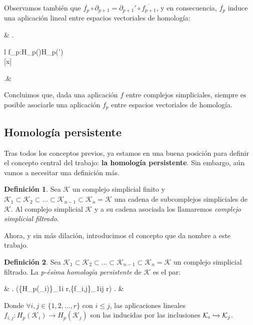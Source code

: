 \documentclass[12pt]{article}
\numberwithin{equation}{section}
\theoremstyle{definition}
\newtheorem{defi}{Definición}
\theoremstyle{remark}
\theoremstyle{plain}
\begin{document}
		Observamos también que $\overline{f_{p}}\circ\partial_{p+1}=\partial_{p+1}'\circ\overline{f_{p+1}}$, y en consecuencia, $\overline{f_{p}}$ induce una aplicación lineal
		entre espacios vectoriales de homología:	
		\begin{flalign*}
			& \left.
			\begin{array}{l}
				f_{p}:H_{p}()\rightarrow H_{p}(')\\[2pt] 
				\hspace{1.35cm} [x] \mapsto [\overline{f_{p}(x)}]
			\end{array}
			\right.&
		\end{flalign*}

		Concluimos que, dada una aplicación $f$ entre complejos simpliciales, siempre es posible asociarle una aplicación $f_{p}$ entre espacios vectoriales de homología.
	
	\subsection{Homología persistente}	
		
		Tras todos los conceptos previos, ya estamos en una buena posición para definir el concepto central del trabajo: \textbf{la homología persistente}. Sin embargo, aún
		vamos a necesitar una definición más.

		\begin{defi}
		
			Sea $\mathcal{K}$ un complejo simplicial finito y $\mathcal{K}_{1}\subset\mathcal{K}_{2}\subset...\subset\mathcal{K}_{n-1}\subset\mathcal{K}_{n}=\mathcal{K}$
			una cadena de subcomplejos simpliciales de $\mathcal{K}$. Al complejo simplicial $\mathcal{K}$ y a su cadena asociada los llamaremos \textit{complejo simplicial filtrado}.

		\end{defi}

		Ahora, y sin más dilación, introducimos el concepto que da nombre a este trabajo.

		\begin{defi}
		
			Sea $\mathcal{K}_{1}\subset\mathcal{K}_{2}\subset...\subset\mathcal{K}_{n-1}\subset\mathcal{K}_{n}=\mathcal{K}$ un complejo simplicial filtrado. La 
			\textit{p-ésima homología persistente} de $\mathcal{K}$ es el par:
			\begin{flalign*}
				& \left.	
				(\{H_{p}(_{i})\}_{1\leq i \leq r},\{f_{i,j}\}_{1\leq i\leq j \leq r})
				\right. &
			\end{flalign*}
			Donde $\forall i,j \in \{1,2,...,r\}$ con $i \leq j$, las aplicaciones lineales 
			$f_{i,j}:H_{p}(\mathcal{K}_{i})\rightarrow H_{p}(\mathcal{K}_{j})$ son las inducidas por las inclusiones $\mathcal{K}_{i}\xhookrightarrow{} \mathcal{K}_{j}$.
	

		\end{defi}
		
\end{document}
